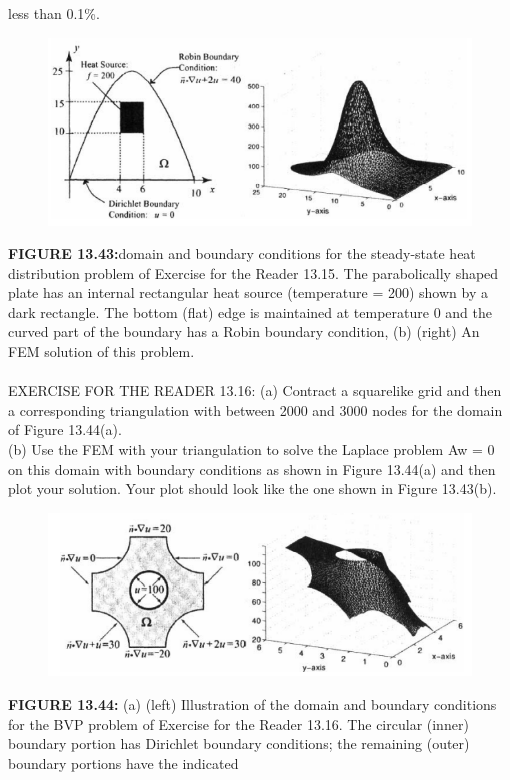 \documentclass[../main.tex]{subfiles}
\begin{document}
less than 0.1\%. 
\begin{figure}[H]
\includegraphics[width=0.9\linewidth]{30}
	\centering
	\label{pfig:ch13_30}
\end{figure}
\textbf{FIGURE 13.43:}domain and boundary conditions for the 
steady-state heat distribution problem of Exercise for the Reader 13.15. The parabolically 
shaped plate has an internal rectangular heat source (temperature = 200) shown by a dark 
rectangle. The bottom (flat) edge is maintained at temperature 0 and the curved part of the 
boundary has a Robin boundary condition, (b) (right) An FEM solution of this problem. 
\\
\\
EXERCISE FOR THE READER 13.16: (a) Contract a squarelike grid and then a 
corresponding triangulation with between 2000 and 3000 nodes for the domain of 
Figure 13.44(a). 
\\
(b) Use the FEM with your triangulation to solve the Laplace problem Aw = 0 on 
this domain with boundary conditions as shown in Figure 13.44(a) and then plot 
your solution. Your plot should look like the one shown in Figure 13.43(b). 
\begin{figure}[H]
\includegraphics[width=0.9\linewidth]{31}
	\centering
	\label{pfig:ch13_31}
\end{figure}
\textbf{FIGURE 13.44:} (a) (left) Illustration of the domain and boundary conditions for the BVP 
problem of Exercise for the Reader 13.16. The circular (inner) boundary portion has 
Dirichlet boundary conditions; the remaining (outer) boundary portions have the indicated 
\end{document}
